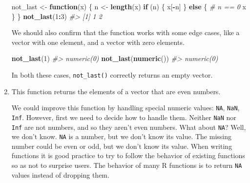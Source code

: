 \documentclass[]{book}
\newenvironment{Shaded}{\begin{snugshade}}{\end{snugshade}}
\newcommand{\CommentTok}[1]{\textcolor[rgb]{0.56,0.35,0.01}{\textit{#1}}}
\newcommand{\ControlFlowTok}[1]{\textcolor[rgb]{0.13,0.29,0.53}{\textbf{#1}}}
\newcommand{\DecValTok}[1]{\textcolor[rgb]{0.00,0.00,0.81}{#1}}
\newcommand{\KeywordTok}[1]{\textcolor[rgb]{0.13,0.29,0.53}{\textbf{#1}}}
\newcommand{\NormalTok}[1]{#1}
\newcommand{\OperatorTok}[1]{\textcolor[rgb]{0.81,0.36,0.00}{\textbf{#1}}}
\newcommand{\StringTok}[1]{\textcolor[rgb]{0.31,0.60,0.02}{#1}}
\theoremstyle{plain}
\theoremstyle{remark}
\begin{document}
\begin{enumerate}
\begin{Shaded}
\begin{Highlighting}[]
\NormalTok{not_last <-}\StringTok{ }\ControlFlowTok{function}\NormalTok{(x) \{}
\NormalTok{  n <-}\StringTok{ }\KeywordTok{length}\NormalTok{(x)}
  \ControlFlowTok{if}\NormalTok{ (n) \{}
\NormalTok{    x[}\OperatorTok{-}\NormalTok{n]}
\NormalTok{  \} }\ControlFlowTok{else}\NormalTok{ \{}
    \CommentTok{# n == 0}
\NormalTok{    x}
\NormalTok{  \}}
\NormalTok{\}}
\KeywordTok{not_last}\NormalTok{(}\DecValTok{1}\OperatorTok{:}\DecValTok{3}\NormalTok{)}
\CommentTok{#> [1] 1 2}
\end{Highlighting}
\end{Shaded}

  We should also confirm that the function works with some edge cases,
  like a vector with one element, and a vector with zero elements.

\begin{Shaded}
\begin{Highlighting}[]
\KeywordTok{not_last}\NormalTok{(}\DecValTok{1}\NormalTok{)}
\CommentTok{#> numeric(0)}
\KeywordTok{not_last}\NormalTok{(}\KeywordTok{numeric}\NormalTok{())}
\CommentTok{#> numeric(0)}
\end{Highlighting}
\end{Shaded}

  In both these cases, \texttt{not\_last()} correctly returns an empty
  vector.
\item
  This function returns the elements of a vector that are even numbers.

\begin{Shaded}
\end{Shaded}

  We could improve this function by handling special numeric values:
  \texttt{NA}, \texttt{NaN}, \texttt{Inf}. However, first we need to
  decide how to handle them. Neither \texttt{NaN} nor \texttt{Inf} are
  not numbers, and so they aren't even numbers. What about \texttt{NA}?
  Well, we don't know. \texttt{NA} is a number, but we don't know its
  value. The missing number could be even or odd, but we don't know its
  value. When writing functions it is good practice to try to follow the
  behavior of existing functions so as not to surprise users. The
  behavior of many R functions is to return \texttt{NA} values instead
  of dropping them.


\end{enumerate}
\end{document}
